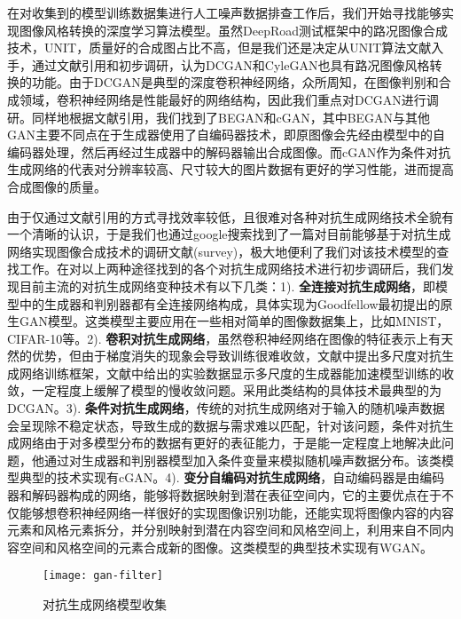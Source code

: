 在对收集到的模型训练数据集进行人工噪声数据排查工作后，我们开始寻找能够实现图像风格转换的深度学习算法模型。虽然DeepRoad测试框架中的路况图像合成技术，UNIT，质量好的合成图占比不高，但是我们还是决定从UNIT算法文献\cite{UNIT}入手，通过文献引用和初步调研，认为DCGAN和CyleGAN也具有路况图像风格转换的功能。由于DCGAN是典型的深度卷积神经网络，众所周知，在图像判别和合成领域，卷积神经网络是性能最好的网络结构，因此我们重点对DCGAN进行调研。同样地根据文献引用，我们找到了BEGAN\cite{BEGAN}和cGAN\cite{cGAN}，其中BEGAN与其他GAN主要不同点在于生成器使用了自编码器技术，即原图像会先经由模型中的自编码器处理，然后再经过生成器中的解码器输出合成图像。而cGAN\cite{cGAN}作为条件对抗生成网络的代表对分辨率较高、尺寸较大的图片数据有更好的学习性能，进而提高合成图像的质量。

由于仅通过文献引用的方式寻找效率较低，且很难对各种对抗生成网络技术全貌有一个清晰的认识，于是我们也通过google搜索找到了一篇对目前能够基于对抗生成网络实现图像合成技术的调研文献(survey)\cite{gan-survey}，极大地便利了我们对该技术模型的查找工作。在对以上两种途径找到的各个对抗生成网络技术进行初步调研后，我们发现目前主流的对抗生成网络变种技术有以下几类：1). \textbf{全连接对抗生成网络}，即模型中的生成器和判别器都有全连接网络构成，具体实现为Goodfellow最初提出的原生GAN模型。这类模型主要应用在一些相对简单的图像数据集上，比如MNIST，CIFAR-10等。2). \textbf{卷积对抗生成网络}，虽然卷积神经网络在图像的特征表示上有天然的优势，但由于梯度消失的现象会导致训练很难收敛，文献\cite{LAPGAN}中提出多尺度对抗生成网络训练框架，文献中给出的实验数据显示多尺度的生成器能加速模型训练的收敛，一定程度上缓解了模型的慢收敛问题。采用此类结构的具体技术最典型的为DCGAN\cite{dcgan}。3). \textbf{条件对抗生成网络}，传统的对抗生成网络对于输入的随机噪声数据会呈现除不稳定状态，导致生成的数据与需求难以匹配，针对该问题，条件对抗生成网络由于对多模型分布的数据有更好的表征能力，于是能一定程度上地解决此问题，他通过对生成器和判别器模型加入条件变量来模拟随机噪声数据分布。该类模型典型的技术实现有cGAN\cite{cGAN}。4). \textbf{变分自编码对抗生成网络}，自动编码器是由编码器和解码器构成的网络，能够将数据映射到潜在表征空间内，它的主要优点在于不仅能够想卷积神经网络一样很好的实现图像识别功能，还能实现将图像内容的内容元素和风格元素拆分，并分别映射到潜在内容空间和风格空间上，利用来自不同内容空间和风格空间的元素合成新的图像。这类模型的典型技术实现有WGAN\cite{WGAN}。

\begin{figure}[h]
    \centering
    \texttt{[image: gan-filter]}
    \caption{对抗生成网络模型收集}
    \label{gan-filter}
\end{figure}

